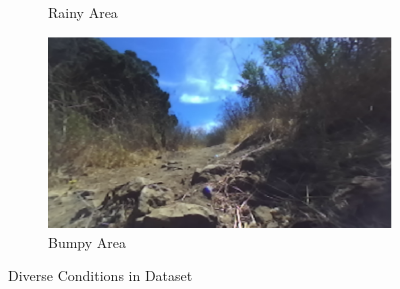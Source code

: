 {\begin{figure}[!th]
\begin{subfigure}{0.3\textwidth}
       \caption{Rainy Area}
    \end{subfigure}
    \begin{subfigure}{0.3\textwidth}
       \centering
       \includegraphics[width=\linewidth]{paper/content/images/bumpy}
       \caption{Bumpy Area}
    \end{subfigure}
    \caption{Diverse Conditions in Dataset}
    \label{fig:diverse}
\end{figure}

}
